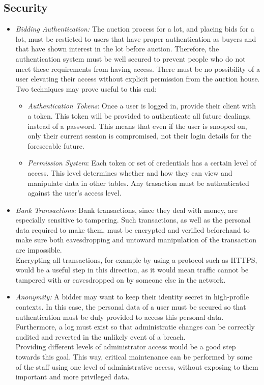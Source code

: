 \documentclass[titlepage, 12pt]{extarticle}
\begin{document}
\subsection{Security}
\begin{itemize}
\item {\it Bidding Authentication:} The auction process for a lot, and placing bids for a lot, must be resticted to users that have proper authentication as buyers and that have shown interest in the lot before auction. Therefore, the authentication system must be well secured to prevent people who do not meet these requirements from having access. There must be no possibility of a user elevating their access without explicit permission from the auction house. 
\\Two techniques may prove useful to this end:
    \begin{itemize}
    \item {\it Authentication Tokens}: Once a user is logged in, provide their client with a token. This token will be provided to authenticate all future dealings, instead of a password. This means that even if the user is snooped on, only their current session is compromised, not their login details for the foreseeable future.
    \item {\it Permission System}: Each token or set of credentials has a certain level of access. This level determines whether and how they can view and manipulate data in other tables. Any trasaction must be authenticated against the user's access level.
    \end{itemize}
\item {\it Bank Transactions:} Bank transactions, since they deal with money, are especially sensitive to tampering. Such transactions, as well as the personal data required to make them, must be encrypted and verified beforehand to make sure both eavesdropping and untoward manipulation of the transaction are impossible. 
\\Encrypting all transactions, for example by using a protocol such as HTTPS, would be a useful step in this direction, as it would mean traffic cannot be tampered with or eavesdropped on by someone else in the network.
\item {\it Anonymity:} A bidder may want to keep their identity secret in high-profile contexts. In this case, the personal data of a user must be secured so that authentication must be duly provided to access this personal data. Furthermore, a log must exist so that administratie changes can be correctly audited and reverted in the unlikely event of a breach.
\\Providing different levels of administrator access would be a good step towards this goal. This way, critical maintenance can be performed by some of the staff using one level of administrative access, without exposing to them important and more privileged data.
\end{itemize}
\end{document}
